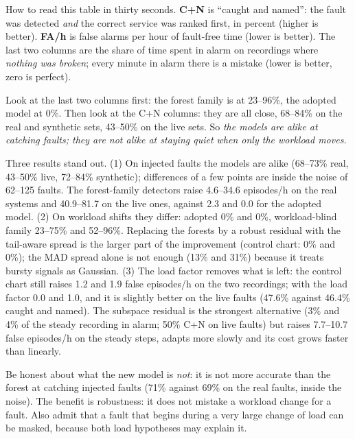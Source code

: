 \begin{simplebox}
How to read this table in thirty seconds. \textbf{C+N} is ``caught and named'': the fault was detected \emph{and} the correct service was ranked first, in percent (higher is better). \textbf{FA/h} is false alarms per hour of fault-free time (lower is better). The last two columns are the share of time spent in alarm on recordings where \emph{nothing was broken}; every minute in alarm there is a mistake (lower is better, zero is perfect).

Look at the last two columns first: the forest family is at 23--96\%, the adopted model at 0\%. Then look at the C+N columns: they are all close, 68--84\% on the real and synthetic sets, 43--50\% on the live sets. So \emph{the models are alike at catching faults; they are not alike at staying quiet when only the workload moves.}
\end{simplebox}

\begin{techbox}
Three results stand out. (1) On injected faults the models are alike (68--73\% real, 43--50\% live, 72--84\% synthetic); differences of a few points are inside the noise of 62--125 faults. The forest-family detectors raise 4.6--34.6 episodes/h on the real systems and 40.9--81.7 on the live ones, against 2.3 and 0.0 for the adopted model. (2) On workload shifts they differ: adopted 0\% and 0\%, workload-blind family 23--75\% and 52--96\%. Replacing the forests by a robust residual with the tail-aware spread is the larger part of the improvement (control chart: 0\% and 0\%); the MAD spread alone is not enough (13\% and 31\%) because it treats bursty signals as Gaussian. (3) The load factor removes what is left: the control chart still raises 1.2 and 1.9 false episodes/h on the two recordings; with the load factor 0.0 and 1.0, and it is slightly better on the live faults (47.6\% against 46.4\% caught and named). The subspace residual is the strongest alternative (3\% and 4\% of the steady recording in alarm; 50\% C+N on live faults) but raises 7.7--10.7 false episodes/h on the steady steps, adapts more slowly and its cost grows faster than linearly.
\end{techbox}

\begin{warnbox}
Be honest about what the new model is \emph{not}: it is not more accurate than the forest at catching injected faults (71\% against 69\% on the real faults, inside the noise). The benefit is robustness: it does not mistake a workload change for a fault. Also admit that a fault that begins during a very large change of load can be masked, because both load hypotheses may explain it.
\end{warnbox}

